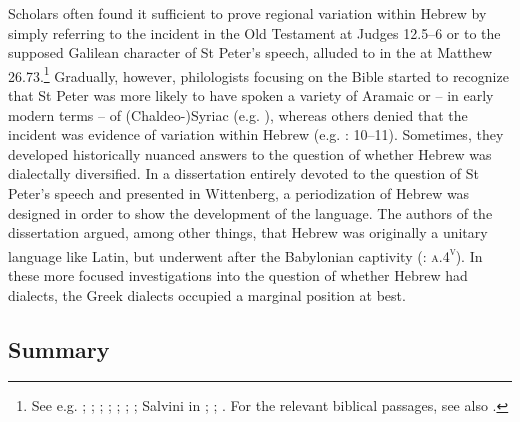 Scholars often found it sufficient to prove regional variation within Hebrew by simply referring to the  incident in the Old Testament at Judges 12.5–6 or to the supposed Galilean character of St Peter’s speech, alluded to in the  at Matthew 26.73.\footnote{See e.g. \citet[6]{Bovelles1533}; \citet[\textsc{b.3}\textsc{\textsuperscript{v}}]{Bachmann1625}; \citet[102]{Weemes1632}; \citet[2]{Wyss1650}; \citet[18]{Walton1657}; \citet[180]{Webb1669}; \citet[6]{Kiesling1712}; Salvini in \citet[103]{Muratori1724}; \citet[30]{Hauptmann1751}; \citet[13--14]{Hof1772}. For the relevant biblical passages, see also \citet[199--200]{VanRooy2018b}.} Gradually, however, philologists focusing on the Bible started to recognize that St Peter was more likely to have spoken a variety of Aramaic or – in early modern terms – of (Chaldeo-)Syriac (e.g. \citealt{Pfeiffer1663}), whereas others denied that the  incident was evidence of variation within Hebrew (e.g. \citealt{Mayer1629}: 10–11). Sometimes, they developed historically nuanced answers to the question of whether Hebrew was dialectally diversified. In a dissertation entirely devoted to the question of St Peter’s speech and presented in Wittenberg, a periodization of Hebrew was designed in order to show the development of the language. The authors of the dissertation argued, among other things, that Hebrew was originally a unitary language like Latin, but underwent  after the Babylonian captivity (\citealt{Pfeiffer1663}: \textsc{a.4}\textsc{\textsuperscript{v}}). In these more focused investigations into the question of whether Hebrew had dialects, the Greek dialects occupied a marginal position at best.

\subsection{Summary}

